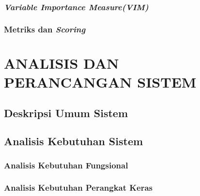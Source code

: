 \documentclass[ugmtesis]{ugmtesis}
\begin{document}
		\subsection{\textit{Variable Importance Measure(VIM)}}
		\label{variable importance measure}
		

		\subsection{Metriks dan \textit{Scoring}}
		\label{metriks dan scoring}
		

	



\chapter{ANALISIS DAN PERANCANGAN SISTEM}
\label{ANALISIS DAN PERANCANGAN SISTEM}

	\section{Deskripsi Umum Sistem}
	\label{rancangan deskripsi umum sistem}
	

	\section{Analisis Kebutuhan Sistem}
	\label{rancangan analisis kebutuhan sistem}
	

		\subsection{Analisis Kebutuhan Fungsional}
		\label{rancangan kebutuhan fungsional}
		

		\subsection{Analisis Kebutuhan Perangkat Keras}
		\label{rancangan analisis kebutuhan perangkat keras}
		
\end{document}
